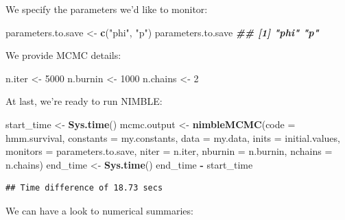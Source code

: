 \documentclass[
  12pt,
]{krantz}
\newenvironment{Shaded}{\begin{snugshade}}{\end{snugshade}}
\newcommand{\AttributeTok}[1]{\textcolor[rgb]{0.13,0.29,0.53}{#1}}
\newcommand{\DecValTok}[1]{\textcolor[rgb]{0.00,0.00,0.81}{#1}}
\newcommand{\DocumentationTok}[1]{\textcolor[rgb]{0.56,0.35,0.01}{\textbf{\textit{#1}}}}
\newcommand{\FunctionTok}[1]{\textcolor[rgb]{0.13,0.29,0.53}{\textbf{#1}}}
\newcommand{\NormalTok}[1]{#1}
\newcommand{\OtherTok}[1]{\textcolor[rgb]{0.56,0.35,0.01}{#1}}
\newcommand{\SpecialCharTok}[1]{\textcolor[rgb]{0.81,0.36,0.00}{\textbf{#1}}}
\newcommand{\StringTok}[1]{\textcolor[rgb]{0.31,0.60,0.02}{#1}}
\begin{document}
We specify the parameters we'd like to monitor:

\begin{Shaded}
\begin{Highlighting}[]
\NormalTok{parameters.to.save }\OtherTok{\textless{}{-}} \FunctionTok{c}\NormalTok{(}\StringTok{"phi"}\NormalTok{, }\StringTok{"p"}\NormalTok{)}
\NormalTok{parameters.to.save}
\DocumentationTok{\#\# [1] "phi" "p"}
\end{Highlighting}
\end{Shaded}

We provide MCMC details:

\begin{Shaded}
\begin{Highlighting}[]
\NormalTok{n.iter }\OtherTok{\textless{}{-}} \DecValTok{5000}
\NormalTok{n.burnin }\OtherTok{\textless{}{-}} \DecValTok{1000}
\NormalTok{n.chains }\OtherTok{\textless{}{-}} \DecValTok{2}
\end{Highlighting}
\end{Shaded}

At last, we're ready to run NIMBLE:

\begin{Shaded}
\begin{Highlighting}[]
\NormalTok{start\_time }\OtherTok{\textless{}{-}} \FunctionTok{Sys.time}\NormalTok{()}
\NormalTok{mcmc.output }\OtherTok{\textless{}{-}} \FunctionTok{nimbleMCMC}\NormalTok{(}\AttributeTok{code =}\NormalTok{ hmm.survival,}
                          \AttributeTok{constants =}\NormalTok{ my.constants,}
                          \AttributeTok{data =}\NormalTok{ my.data,}
                          \AttributeTok{inits =}\NormalTok{ initial.values,}
                          \AttributeTok{monitors =}\NormalTok{ parameters.to.save,}
                          \AttributeTok{niter =}\NormalTok{ n.iter,}
                          \AttributeTok{nburnin =}\NormalTok{ n.burnin,}
                          \AttributeTok{nchains =}\NormalTok{ n.chains)}
\NormalTok{end\_time }\OtherTok{\textless{}{-}} \FunctionTok{Sys.time}\NormalTok{()}
\NormalTok{end\_time }\SpecialCharTok{{-}}\NormalTok{ start\_time}
\end{Highlighting}
\end{Shaded}

\begin{verbatim}
## Time difference of 18.73 secs
\end{verbatim}

We can have a look to numerical summaries:
\end{document}
